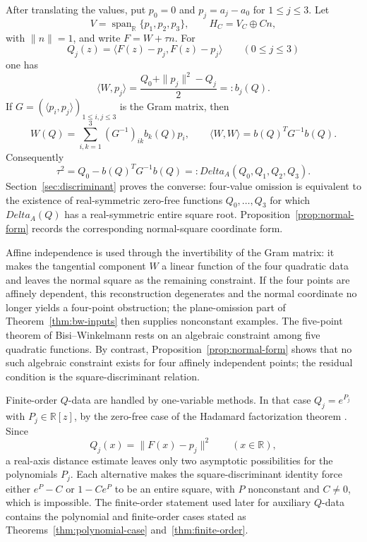 \documentclass[11pt]{amsart}
\def\HHc{H_C}%
\def\CC{C}%
\def\DeltaA{Delta_A}%
\numberwithin{equation}{section}
\theoremstyle{definition}
\theoremstyle{remark}
\newcommand{\CC}{\mathbb C}
\newcommand{\RR}{\mathbb R}
\newcommand{\HHc}{\mathbb H_{\mathbb C}}
\newcommand{\DeltaA}{\Delta_A}
\begin{document}
After translating the values, put $p_0=0$ and $p_j=a_j-a_0$ for $1\le j\le3$.  Let
\[
V=\operatorname{span}_{\RR}\{p_1,p_2,p_3\},\qquad \HHc=V_{\CC}\oplus\CC n,
\]
with $\|n\|=1$, and write $F=W+\tau n$.  For
\[
Q_j(z)=\langle F(z)-p_j,F(z)-p_j\rangle\qquad(0\le j\le3)
\]
one has
\[
\langle W,p_j\rangle=\frac{Q_0+\|p_j\|^2-Q_j}{2}=:b_j(Q).
\]
If $G=(\langle p_i,p_j\rangle)_{1\le i,j\le3}$ is the Gram matrix, then
\[
W(Q)=\sum_{i,k=1}^3(G^{-1})_{ik}b_k(Q)p_i,
\qquad
\langle W,W\rangle=b(Q)^TG^{-1}b(Q).
\]
Consequently
\[
\tau^2=Q_0-b(Q)^TG^{-1}b(Q)=:\DeltaA(Q_0,Q_1,Q_2,Q_3).
\]
Section~\ref{sec:discriminant} proves the converse: four-value omission is equivalent to the existence of real-symmetric zero-free functions $Q_0,\ldots,Q_3$ for which $\DeltaA(Q)$ has a real-symmetric entire square root.  Proposition~\ref{prop:normal-form} records the corresponding normal-square coordinate form.

Affine independence is used through the invertibility of the Gram matrix: it makes the tangential component $W$ a linear function of the four quadratic data and leaves the normal square as the remaining constraint.  If the four points are affinely dependent, this reconstruction degenerates and the normal coordinate no longer yields a four-point obstruction; the plane-omission part of Theorem~\ref{thm:bw-inputs} then supplies nonconstant examples.  The five-point theorem of Bisi--Winkelmann rests on an algebraic constraint among five quadratic functions.  By contrast, Proposition~\ref{prop:normal-form} shows that no such algebraic constraint exists for four affinely independent points; the residual condition is the square-discriminant relation.

Finite-order $Q$-data are handled by one-variable methods.  In that case $Q_j=e^{P_j}$ with $P_j\in\RR[z]$, by the zero-free case of the Hadamard factorization theorem \cite[Ch.~I, \S\S~8--9]{Boas1954EntireFunctions,Levin1980Zeros}.  Since
\[
Q_j(x)=\|F(x)-p_j\|^2\qquad (x\in\RR),
\]
a real-axis distance estimate leaves only two asymptotic possibilities for the polynomials $P_j$.  Each alternative makes the square-discriminant identity force either $e^P-C$ or $1-Ce^P$ to be an entire square, with $P$ nonconstant and $C\ne0$, which is impossible.  The finite-order statement used later for auxiliary $Q$-data contains the polynomial and finite-order cases stated as Theorems~\ref{thm:polynomial-case} and~\ref{thm:finite-order}.
\end{document}
